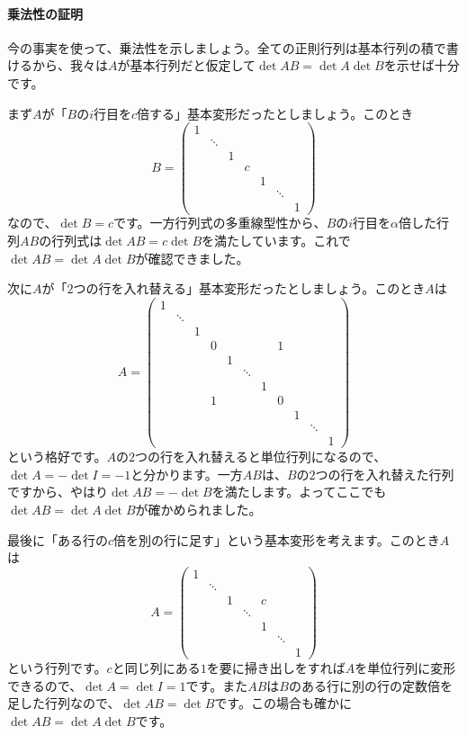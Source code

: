 \paragraph{乗法性の証明}

今の事実を使って、乗法性を示しましょう。全ての正則行列は基本行列の積で書けるから、我々は$A$が基本行列だと仮定して$\det AB = \det A \det B$を示せば十分です。

まず$A$が「$B$の$i$行目を$c$倍する」基本変形だったとしましょう。このとき
\[
B = 
\begin{pmatrix}
1 & \\
& \ddots \\
& & 1 \\
& & & c \\
& & & & 1 \\
& & & & & \ddots \\
& & & & & & 1
\end{pmatrix}
\]
なので、$\det B = c$です。一方行列式の多重線型性から、$B$の$i$行目を$\alpha$倍した行列$AB$の行列式は$\det AB = c\det B$を満たしています。これで$\det AB = \det A \det B$が確認できました。

次に$A$が「$2$つの行を入れ替える」基本変形だったとしましょう。このとき$A$は
\[
A =
\begin{pmatrix}
1 & \\
& \ddots  &  \\
& & 1 \\
& & & 0 & & & & 1 \\
& & & & 1 &  \\
& & & & & \ddots &  \\
& & & & & & 1  \\
& & & 1 & & & & 0 \\
& & & & & & & & 1 \\
& & & & & & & & & \ddots \\
& & & & & & & & & & 1 
\end{pmatrix}
\]
という格好です。$A$の$2$つの行を入れ替えると単位行列になるので、$\det A = - \det I = -1$と分かります。一方$AB$は、$B$の$2$つの行を入れ替えた行列ですから、やはり$\det AB = - \det B$を満たします。よってここでも$\det AB = \det A \det B$が確かめられました。

最後に「ある行の$c$倍を別の行に足す」という基本変形を考えます。このとき$A$は
\[
A =
\begin{pmatrix}
1 & \\
& \ddots \\
& & 1 &  & c \\
& & & \ddots &  \\
& & & & 1 \\
& & & & & \ddots \\
& & & & & & 1
\end{pmatrix}
\]
という行列です。$c$と同じ列にある$1$を要に掃き出しをすれば$A$を単位行列に変形できるので、$\det A = \det I = 1$です。また$AB$は$B$のある行に別の行の定数倍を足した行列なので、$\det AB = \det B$です。この場合も確かに$\det AB = \det A \det B$です。

